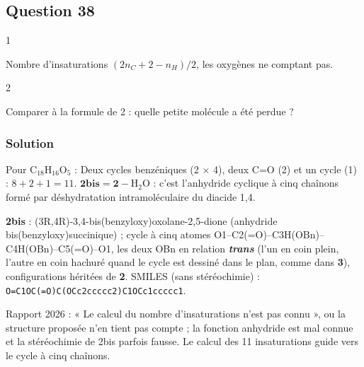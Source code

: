 \documentclass[11pt,a4paper]{article}
\newcommand{\equationajustee}[1]{%
  \sbox{\boiteequation}{$\displaystyle #1$}%
  \ifdim\wd\boiteequation>\linewidth
    \[\resizebox{\linewidth}{!}{\usebox{\boiteequation}}\]%
  \else
    \[#1\]%
  \fi}
\begin{document}
\hypertarget{question-38}{%
\subsection{Question 38}\label{question-38}}

\begin{indication}{1}

Nombre d'insaturations \((2n_C+2-n_H)/2\), les oxygènes ne comptant pas.

\end{indication}

\begin{indication}{2}

Comparer à la formule de 2 : quelle petite molécule a été perdue ?

\end{indication}

\hypertarget{solution-37}{%
\subsubsection{Solution}\label{solution-37}}

Pour \(\mathrm{C_{18}H_{16}O_5}\) :
\equationajustee{\boxed{n_i=\frac{2\times18+2-16}{2}=11}}
Deux cycles benzéniques (2 × 4), deux C=O (2) et un cycle (1) : \(8+2+1=11\). \(\mathbf{2bis}=\mathbf 2-\mathrm{H_2O}\) : c'est l'anhydride cyclique à cinq chaînons formé par déshydratation intramoléculaire du diacide 1,4.

\textbf{2bis} : (3R,4R)-\allowbreak{}3,4-\allowbreak{}bis(benzyloxy)oxolane-\allowbreak{}2,5-\allowbreak{}dione (anhydride bis(benzyloxy)succinique) ; cycle à cinq atomes O1--\allowbreak{}C2(=O)--\allowbreak{}C3H(OBn)--\allowbreak{}C4H(OBn)--\allowbreak{}C5(=O)--\allowbreak{}O1, les deux OBn en relation \textbf{\emph{trans}} (l'un en coin plein, l'autre en coin hachuré quand le cycle est dessiné dans le plan, comme dans \textbf{3}), configurations héritées de \textbf{2}. SMILES (sans stéréochimie) : \texttt{O=\allowbreak{}C1OC(\allowbreak{}=\allowbreak{}O)\allowbreak{}C(\allowbreak{}OCc2ccccc2)\allowbreak{}C1OCc1ccccc1}.

\begin{jury}

Rapport 2026 : « Le calcul du nombre d'insaturations n'est pas connu », ou la structure proposée n'en tient pas compte ; la fonction anhydride est mal connue et la stéréochimie de 2bis parfois fausse. Le calcul des 11 insaturations guide vers le cycle à cinq chaînons.

\end{jury}
\end{document}
